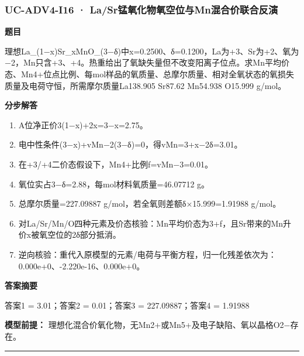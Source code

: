 \documentclass[UTF8,11pt,a4paper]{ctexart}
\begin{document}
\subsubsection*{UC-ADV4-I16 · La/Sr锰氧化物氧空位与Mn混合价联合反演}
\noindent\textbf{题目}\par
理想La\_(1−x)Sr\_xMnO\_(3−δ)中x=0.2500、δ=0.1200，La为+3、Sr为+2、氧为−2，Mn只含+3、+4。热重给出了氧缺失量但不改变阳离子位点。求Mn平均价态、Mn4+位点比例、每mol样品的氧质量、总摩尔质量、相对全氧状态的氧损失质量及电荷守恒，所需摩尔质量La138.905 Sr87.62 Mn54.938 O15.999 g/mol。\par
\medskip\noindent\textbf{分步解答}
\begin{enumerate}
\item A位净正价3(1−x)+2x=3−x=2.75。
\item 电中性条件(3−x)+vMn−2(3−δ)=0，得vMn=3+x−2δ=3.01。
\item 在+3/+4二价态假设下，Mn4+比例f=vMn−3=0.01。
\item 氧位实占3−δ=2.88，每mol材料氧质量=46.07712 g。
\item 总摩尔质量=227.09887 g/mol，若全氧则差额δ×15.999=1.91988 g/mol。
\item 对La/Sr/Mn/O四种元素及价态核验：Mn平均价态为3+f，且Sr带来的Mn升价x被氧空位的2δ部分抵消。
\item 逆向核验：重代入原模型的元素/电荷与平衡方程，归一化残差依次为：0.000e+0、-2.220e-16、0.000e+0。
\end{enumerate}
\noindent\textbf{答案摘要}\par
答案1 = 3.01；答案2 = 0.01；答案3 = 227.09887；答案4 = 1.91988\par
\noindent\textbf{模型前提：}
理想化混合价氧化物，无Mn2+或Mn5+及电子缺陷、氧以晶格O2−存在。\par
\medskip\hrule\medskip
{}
\end{document}

